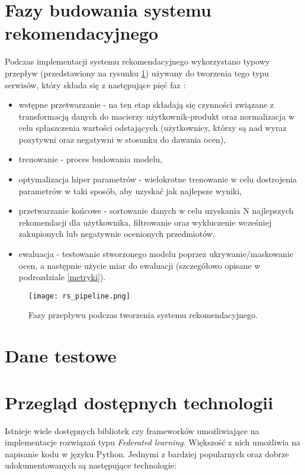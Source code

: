\section{Fazy budowania systemu rekomendacyjnego}

Podczas implementacji systemu rekomendacyjnego wykorzystano typowy przepływ (przedstawiony na rysunku \ref{fig:rs_pipeline}) używany do tworzenia tego typu serwisów, który składa się z następujące pięć faz \cite{rs_in_real}:
\begin{itemize}
    \item wstępne przetwarzanie - na ten etap składają się czynności związane z transformacją danych do macierzy użytkownik-produkt oraz normalizacja w celu spłaszczenia wartości odstających (użytkownicy, którzy są nad wyraz pozytywni oraz negatywni w stosunku do dawania ocen),
    \item trenowanie - proces budowania modelu,
    \item optymalizacja hiper parametrów - wielokrotne trenowanie w celu dostrojenia parametrów w taki sposób, aby uzyskać jak najlepsze wyniki,
    \item przetwarzanie końcowe - sortowanie danych w celu uzyskania N najlepszych rekomendacji dla użytkownika, filtrowanie oraz wykluczenie wcześniej zakupionych lub negatywnie ocenionych przedmiotów,
    \item ewaluacja - testowanie stworzonego modelu poprzez ukrywanie/maskowanie ocen, a następnie użycie miar do ewaluacji (szczegółowo opisane w podrozdziale \ref{metryki}).
\end{itemize}{}

\begin{figure}
    \texttt{[image: rs\_pipeline.png]}
    \caption{Fazy przepływu podczas tworzenia systemu rekomendacyjnego.}
    \label{fig:rs_pipeline}
\end{figure}

\section{Dane testowe}

\section{Przegląd dostępnych technologii}

Istnieje wiele dostępnych bibliotek czy frameworków umożliwiające na implementacje rozwiązań typu \textit{Federated learning}. Większość z nich umożliwia na napisanie kodu w języku Python. Jednymi z bardziej popularnych oraz dobrze udokumentowanych są następujące technologie:

